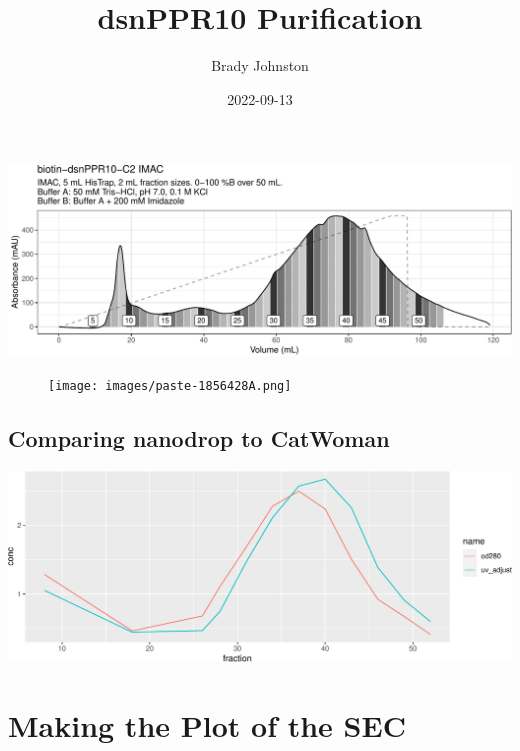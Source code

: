 \documentclass[
  letterpaper,
  DIV=11,
  numbers=noendperiod]{scrartcl}
\title{dsnPPR10 Purification}
\author{Brady Johnston}
\date{2022-09-13}
\begin{document}
\maketitle
\ifdefined\Shaded\renewenvironment{Shaded}{\begin{tcolorbox}[breakable, frame hidden, interior hidden, boxrule=0pt, borderline west={3pt}{0pt}{shadecolor}, sharp corners, enhanced]}{\end{tcolorbox}}\fi

\includegraphics{dsnppr10-purification_files/figure-pdf/unnamed-chunk-3-1.pdf}

\begin{figure}

{\centering \texttt{[image: images/paste-1856428A.png]}

}

\end{figure}

\hypertarget{comparing-nanodrop-to-catwoman}{%
\subsection{Comparing nanodrop to
CatWoman}\label{comparing-nanodrop-to-catwoman}}

\includegraphics{dsnppr10-purification_files/figure-pdf/unnamed-chunk-4-1.pdf}

\newpage

\hypertarget{making-the-plot-of-the-sec}{%
\section{Making the Plot of the SEC}\label{making-the-plot-of-the-sec}}
\end{document}
